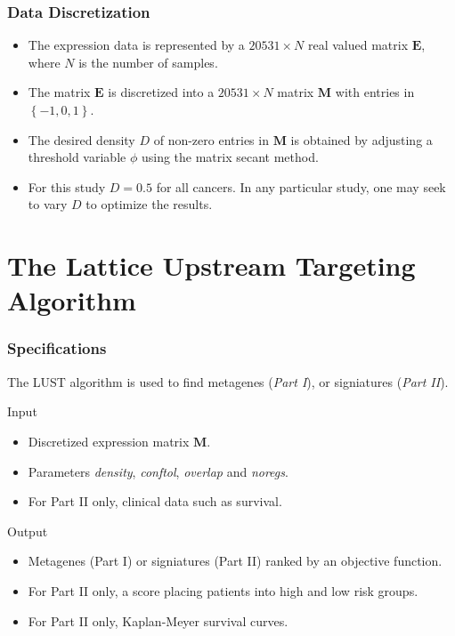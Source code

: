 \documentclass[
	11pt, %
]{beamer}
\begin{document}
\begin{frame}
	\frametitle{Data Discretization}
	
	\begin{itemize}
        \item The expression data is represented by a $20531 \times N$ real valued matrix $\mathbf{E}$, where $N$ is the number of samples.
        \item The matrix $\mathbf{E}$ is discretized into a $20531 \times N$ matrix $\mathbf{M}$ with entries in $\left\{ -1, 0, 1\right\}$.
        \item The desired density $D$ of non-zero entries in $\mathbf{M}$ is obtained by adjusting a threshold variable $\phi$ using the matrix secant method.
        \item For this study $D = 0.5$ for all cancers. In any particular study, one may seek to vary $D$ to optimize the results.
    \end{itemize}
\end{frame}


\section{The Lattice Upstream Targeting Algorithm}

\begin{frame}
	\frametitle{Specifications}
	
	\begin{block}{}
        The LUST algorithm is used to find metagenes (\emph{Part I}), or signiatures (\emph{Part II}).
    \end{block}

    \begin{block}{Input}
        \begin{itemize}
            \item Discretized expression matrix $\mathbf{M}$.
            \item Parameters \emph{density}, \emph{conftol}, \emph{overlap} and \emph{noregs}.
            \item For Part II only, clinical data such as survival.
        \end{itemize}
    \end{block}

    \begin{block}{Output}
        \begin{itemize}
            \item Metagenes (Part I) or signiatures (Part II) ranked by an objective function.
            \item For Part II only, a score placing patients into high and low risk groups.
            \item For Part II only, Kaplan-Meyer survival curves.
        \end{itemize}
    \end{block}
\end{frame}
\end{document}
